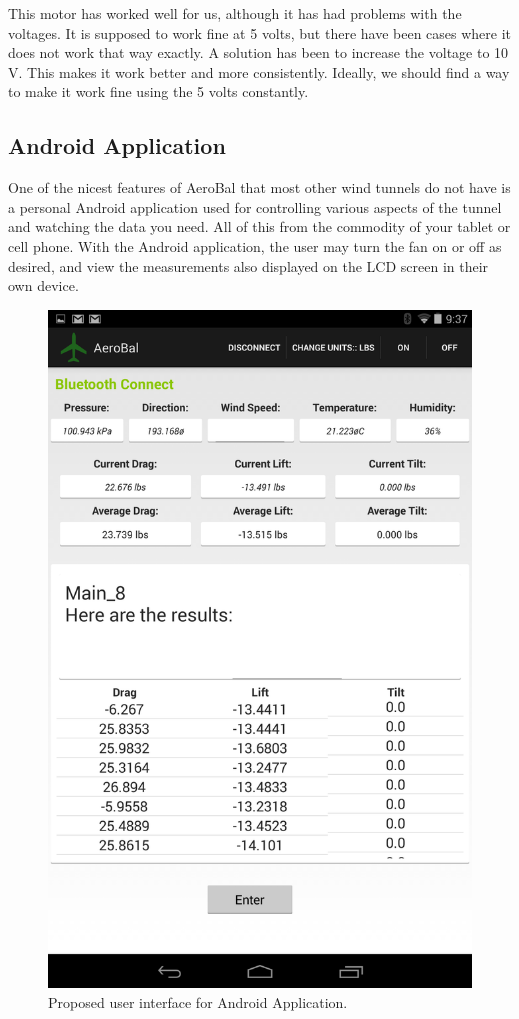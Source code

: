 		This motor has worked well for us, although it has had problems with the voltages. It is supposed to work fine at 5 volts, but there have been cases where it does not work that way exactly. A solution has been to increase the voltage to 10 V. This makes it work better and more consistently. Ideally, we should find a way to make it work fine using the 5 volts constantly.
		
		\subsection{Android Application}
		
		One of the nicest features of AeroBal that most other wind tunnels do not have is a personal Android application used for controlling various aspects of the tunnel and watching the data you need. All of this from the commodity of your tablet or cell phone. With the Android application, the user may turn the fan on or off as desired, and view the measurements also displayed on the LCD screen in their own device.
		
		\begin{figure}[H]
			\centering
				\includegraphics[scale=0.4]{img/androidApp}
			\caption{Proposed user interface for Android Application.}
		\end{figure}
		
